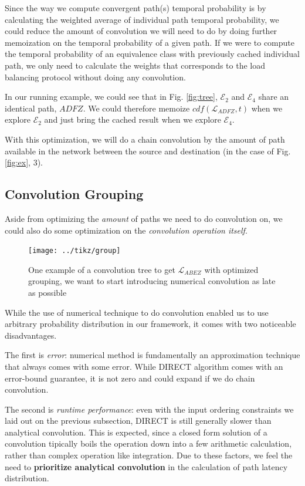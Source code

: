 \documentclass[10pt,sigconf,letterpaper,anonymous,nonacm]{acmart}
\begin{document}
Since the way we compute convergent path(s) temporal probability is by calculating the weighted average of 
individual path temporal probability, we could reduce the amount of convolution we will need to do by doing further memoization 
on the temporal probability of a given path.
If we were to compute the temporal probability of an equivalence class with previously cached individual 
path, we only need to calculate the weights that corresponds to the load balancing protocol without 
doing any convolution.

In our running example, we could see that in Fig. \ref{fig:tree}, $\mathcal{E}_2$ and $\mathcal{E}_4$ share 
an identical path, $ADFZ$.
We could therefore memoize $cdf(\mathcal{L}_{ADFZ}, t)$ when we explore $\mathcal{{E}_2}$ and just bring the 
cached result when we explore $\mathcal{{E}_4}$.

With this optimization, we will do a chain convolution by the amount of path available in the network between 
the source and destination (in the case of Fig. \ref{fig:ex}, 3).

\subsection{Convolution Grouping}
Aside from optimizing the \textit{amount} of paths we need to do convolution on, we could also do some 
optimization on the \textit{convolution operation itself}. 

\begin{figure}[h]
    \centering
    \texttt{[image: ../tikz/group]}
    \caption{One example of a convolution tree to get $\mathcal{L}_{ABEZ}$ with optimized grouping,
    we want to start introducing numerical convolution as late as possible}
    \label{fig:grouping}
\end{figure}

While the use of numerical technique to do convolution enabled us to use arbitrary probability distribution 
in our framework, it comes with two noticeable disadvantages.

The first is \textit{error}: numerical method is fundamentally an approximation technique that always 
comes with some error. 
While DIRECT algorithm comes with an error-bound guarantee, it is not zero and could expand if we do 
chain convolution.

The second is \textit{runtime performance}: even with the input ordering constraints we laid out on the 
previous subsection, DIRECT is still generally slower than analytical convolution.
This is expected, since a closed form solution of a convolution tipically boils the operation down into 
a few arithmetic calculation, rather than complex operation like integration.
Due to these factors, we feel the need to \textbf{prioritize analytical convolution} in the calculation of 
path latency distribution.
\end{document}
